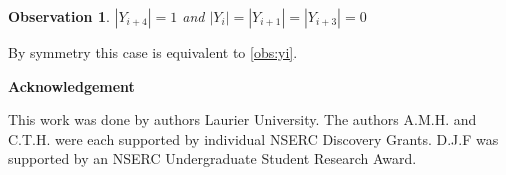\documentclass[12pt]{article}
\newtheorem{Observation}[Theorem]{Observation}
\begin{document}
\begin{Observation}\label{obs:yi4}
$|Y_{i+4}| = 1$ and $|Y_{i}| = |Y_{i+1}| = |Y_{i+3}| = 0$
\end{Observation}
 By symmetry this case is equivalent to \ref{obs:yi}.

\begin{center}
{\bf Acknowledgement}
\end{center}
This work was done by authors  Laurier University. The authors A.M.H. and C.T.H. were each supported by individual NSERC Discovery Grants. D.J.F was supported by an NSERC Undergraduate Student Research Award.


\clearpage
\begin{thebibliography}{99}

\end{thebibliography}
\end{document}

